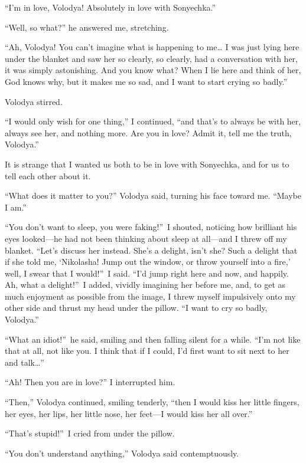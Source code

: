 ``I'm in love, Volodya! Absolutely in love with Sonyechka.'' %

``Well, so what?'' he answered me, stretching.

``Ah, Volodya! You can't imagine what is happening to me\ldots{} I was just lying here under the blanket and saw her so clearly, so clearly, had a conversation with her, it was simply astonishing. And you know what? When I lie here and think of her, God knows why, but it makes me so sad, and I want to start crying so badly.'' %

Volodya stirred.

``I would only wish for one thing,'' I continued, ``and that's to always be with her, always see her, and nothing more. Are you in love? Admit it, tell me the truth, Volodya.'' %

It is strange that I wanted us both to be in love with Sonyechka, and for us to tell each other about it.

``What does it matter to you?'' Volodya said, turning his face toward me. ``Maybe I am.'' %

``You don't want to sleep, you were faking!''~I shouted, noticing how brilliant his eyes looked---he had not been thinking about sleep at all---and I threw off my blanket. ``Let's discuss her instead. She's a delight, isn't she? Such a delight that if she told me, `Nikolasha! Jump out the window, or throw yourself into a fire,' well, I swear that I would!''~I said. ``I'd jump right here and now, and happily. Ah, what a delight!''~I added, vividly imagining her before me, and, to get as much enjoyment as possible from the image, I threw myself impulsively onto my other side and thrust my head under the pillow. ``I want to cry so badly, Volodya.'' %

``What an idiot!''~he said, smiling and then falling silent for a while. ``I'm not like that at all, not like you. I think that if I could, I'd first want to sit next to her and talk\ldots{}'' %

``Ah! Then you are in love?'' I interrupted him. %

``Then,'' Volodya continued, smiling tenderly, ``then I would kiss her little fingers, her eyes, her lips, her little nose, her feet---I would kiss her all over.'' %

``That's stupid!''~I cried from under the pillow. %

``You don't understand anything,'' Volodya said contemptuously. %

